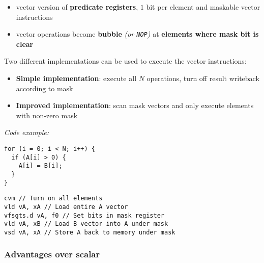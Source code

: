 \documentclass[english]{article}
\begin{document}
\begin{itemize}
  \item vector version of \textbf{predicate registers}, \(1\) bit per element and maskable vector instructions
  \item vector operations become \textbf{bubble} \textit{(or \texttt{NOP})} at \textbf{elements where mask bit is clear}
\end{itemize}

Two different implementations can be used to execute the vector instructions:

\begin{itemize}
  \item \textbf{Simple implementation}: execute all \(N\) operations, turn off result writeback according to mask
  \item \textbf{Improved implementation}: scan mask vectors and only execute elements with non-zero mask
\end{itemize}

\textit{Code example:}

\begin{minipage}[t]{0.35\textwidth}
  \begin{verbatim}
for (i = 0; i < N; i++) {
  if (A[i] > 0) {
    A[i] = B[i];
  }
}
    \end{verbatim}
\end{minipage}
\begin{minipage}[t]{0.645\textwidth}
  \begin{verbatim}
cvm // Turn on all elements
vld vA, xA // Load entire A vector
vfsgts.d vA, f0 // Set bits in mask register
vld vA, xB // Load B vector into A under mask
vsd vA, xA // Store A back to memory under mask
    \end{verbatim}
\end{minipage}

\subsubsection{Advantages over scalar}
\end{document}
